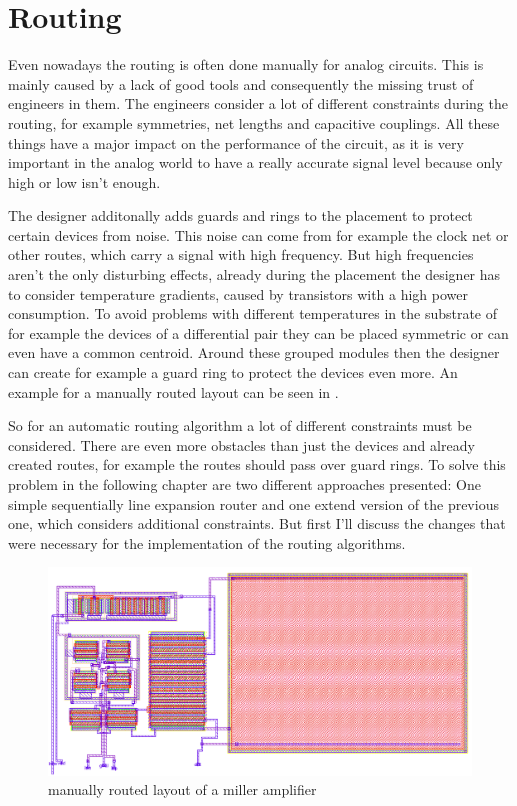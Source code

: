 \chapter{Routing}

Even nowadays the routing is often done manually for analog circuits. This is mainly caused by a lack of good tools and consequently the missing trust of engineers in them. The engineers consider a lot of different constraints during the routing, for example symmetries, net lengths and capacitive couplings. All these things have a major impact on the performance of the circuit, as it is very important in the analog world to have a really accurate signal level because only high or low isn't enough.

The designer additonally adds guards and rings to the placement to protect certain devices from noise. This noise can come from for example the clock net or other routes, which carry a signal with high frequency. But high frequencies aren't the only disturbing effects, already during the placement the designer has to consider temperature gradients, caused by transistors with a high power consumption. To avoid problems with different temperatures in the substrate of for example the devices of a differential pair they can be placed symmetric or can even have a common centroid. Around these grouped modules then the designer can create for example a guard ring to protect the devices even more. An example for a manually routed layout can be seen in .

So for an automatic routing algorithm a lot of different constraints must be considered. There are even more obstacles than just the devices and already created routes, for example the routes should pass over guard rings. To solve this problem in the following chapter are two different approaches presented: One simple sequentially line expansion router and one extend version of the previous one, which considers additional constraints. But first I'll  discuss the changes that were necessary for the implementation of the routing algorithms.

\begin{figure}
	\centering
	\includegraphics[scale=.4]{FIG/miller_amplifier_layout_routed.png}
  	\caption{manually routed layout of a miller amplifier}
	\label{fig:miller_amplifier_routed_layout}
\end{figure}

